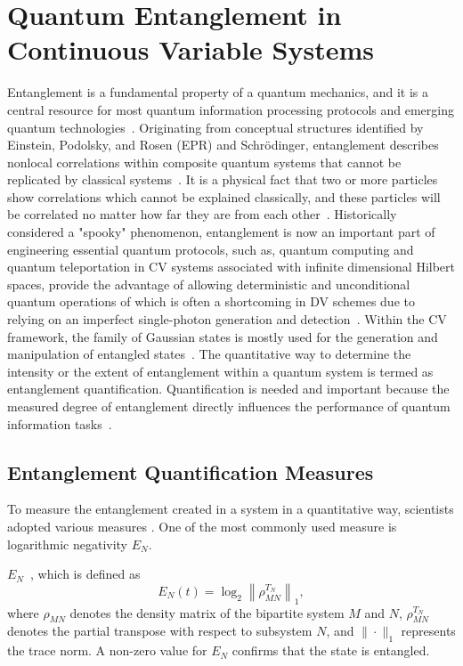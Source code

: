 \section{Quantum Entanglement in Continuous Variable Systems}
Entanglement is a fundamental property of a quantum mechanics, and it is a central resource for most quantum information processing protocols and emerging quantum technologies~\cite{Masada2016}. Originating from conceptual structures identified by Einstein, Podolsky, and Rosen (EPR) and Schrödinger, entanglement describes nonlocal correlations within composite quantum systems that cannot be replicated by classical systems~\cite{Horodecki2009}. It is a physical fact that two or more particles show correlations which cannot be explained classically, and these particles will be correlated no matter how far they are from each other~\cite{NielsenChuang2000,Horodecki2009}. Historically considered  a "spooky" phenomenon, entanglement is now an important part of engineering essential quantum protocols, such as, quantum computing and quantum teleportation in CV systems associated with infinite dimensional Hilbert spaces, provide the advantage of allowing deterministic and unconditional quantum operations of which is often a shortcoming in DV schemes due to relying on an imperfect single-photon generation and detection~\cite{Masada2016}. Within the CV framework, the family of Gaussian states is mostly used for the generation and manipulation of entangled states~\cite{Adesso2007}.
The quantitative way to determine the intensity or the extent of entanglement within a quantum system is termed as entanglement quantification. Quantification is needed and important because the measured degree of entanglement directly influences the performance of quantum information tasks~\cite{NielsenChuang2000,Horodecki2009,Zhahir2022}.

\subsection{Entanglement Quantification Measures}
To measure the entanglement created in a system in a quantitative way, scientists adopted various  measures\cite{NielsenChuang2000}
. 
One of the most commonly used measure is logarithmic negativity $E_{N}$.

$E_{N}$~\cite{VidalWerner2002,Plenio2005}, which is defined as
\begin{equation}
	E_{N}(t) = \log_{2} \left\| \rho_{MN}^{T_{N}} \right\|_{1},
\end{equation}
where $\rho_{MN}$ denotes the density matrix of the bipartite system $M$ and $N$, 
$\rho_{MN}^{T_{N}}$ denotes the partial transpose with respect to subsystem $N$, 
and $\|\cdot\|_{1}$ represents the trace norm.
A non-zero value for $E_{N}$
confirms that the state is entangled.

